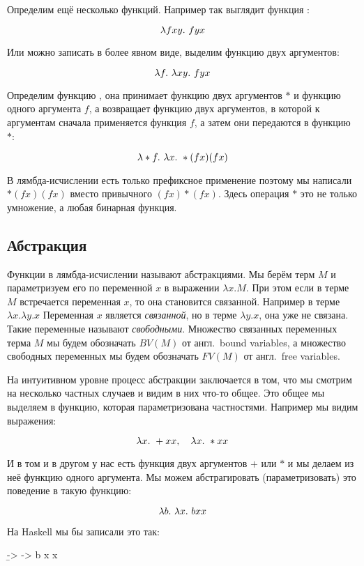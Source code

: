 Определим ещё несколько функций. Например так выглядит функция
:

\[ \lambda fxy .\  fyx \]

Или можно записать в более явном виде, выделим функцию двух аргументов:

\[ \lambda f .\  \lambda xy .\  fyx \]

Определим функцию , она принимает функцию двух аргументов $*$
и функцию одного аргумента $f$, а возвращает функцию двух аргументов,
в которой к аргументам сначала применяется функция $f$, а затем они 
передаются в функцию $*$:

\[ \lambda * f .\  \lambda x .\  *(fx)(fx) \]

В лямбда-исчислении есть только префиксное применение поэтому мы 
написали $*(fx)(fx)$ вместо привычного $(fx)*(fx)$. Здесь операция
$*$ это не только умножение, а любая бинарная функция.

\subsection{Абстракция}

Функции в лямбда-исчислении называют абстракциями. Мы берём
терм $M$ и параметризуем его по переменной $x$ в выражении 
$\lambda x. M$. При этом если в терме $M$ встречается переменная 
$x$, то она становится связанной. Например в терме $\lambda x . \lambda y . x$
Переменная $x$ является \emph{связанной}, но в терме $\lambda y . x$, она
уже не связана. Такие переменные называют \emph{свободными}.
Множество связанных переменных терма $M$ мы будем обозначать $BV(M)$
от англ.~bound variables, а множество свободных переменных
мы будем обозначать $FV(M)$ от англ.~free variables.

На интуитивном уровне процесс абстракции заключается в том,
что  мы смотрим на несколько частных случаев и видим в них
что-то общее. Это общее мы выделяем в функцию, которая параметризована
частностями. Например мы видим выражения:

\[ \lambda x .\  +xx, \quad \lambda x .\  *xx \]

И в том и в другом у нас есть функция двух аргументов $+$ или $*$ и 
мы делаем из неё функцию одного аргумента. Мы можем абстрагировать 
(параметризовать) это поведение в такую функцию:

\[ \lambda b.\  \lambda x.\  b xx \]

На Haskell мы бы записали это так:

\begin{code}
\b -> \x -> b x x
\end{code}

